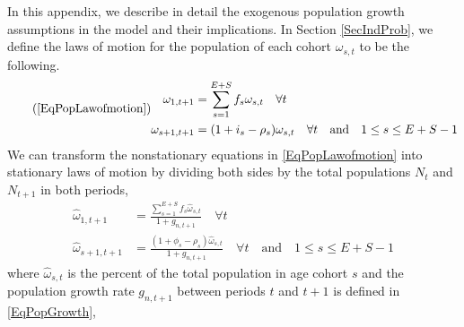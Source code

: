 \documentclass[letterpaper,12pt]{article}
\theoremstyle{definition}
\begin{document}
  In this appendix, we describe in detail the exogenous population growth assumptions in the model and their implications. In Section \ref{SecIndProb}, we define the laws of motion for the population of each cohort $\omega_{s,t}$ to be the following.
  \begin{equation}\tag{\ref{EqPopLawofmotion}}
    \begin{split}
      \omega_{1,t+1} &= \sum_{s=1}^{E+S} f_s\omega_{s,t}\quad\forall t \\
        \omega_{s+1,t+1} &= (1 + i_s - \rho_s)\omega_{s,t}\quad\forall t\quad\text{and}\quad 1\leq s \leq E+S-1
    \end{split}
  \end{equation}
  We can transform the nonstationary equations in \eqref{EqPopLawofmotion} into stationary laws of motion by dividing both sides by the total populations $N_t$ and $N_{t+1}$ in both periods,
  \begin{equation}\label{EqPopLawofmotionStat}
    \begin{split}
      \hat{\omega}_{1,t+1} &= \frac{\sum_{s=1}^{E+S} f_s\hat{\omega}_{s,t}}{1+g_{n,t+1}}\quad\forall t \\
      \hat{\omega}_{s+1,t+1} &= \frac{(1 + \phi_s - \rho_s)\hat{\omega}_{s,t}}{1+g_{n,t+1}}\quad\forall t\quad\text{and}\quad 1\leq s \leq E+S-1
    \end{split}
  \end{equation}
  where $\hat{\omega}_{s,t}$ is the percent of the total population in age cohort $s$ and the population growth rate $g_{n,t+1}$ between periods $t$ and $t+1$ is defined in \eqref{EqPopGrowth},
\end{document}

